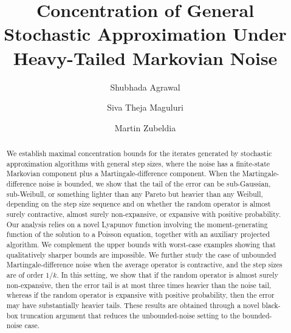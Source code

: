 \documentclass{article}
\title{Concentration of General Stochastic Approximation Under Heavy-Tailed Markovian Noise}
\author[1]{Shubhada Agrawal}
\author[2]{Siva Theja Maguluri}
\author[3]{Martin Zubeldia}
\affil[1]{Indian Institute of Science, \texttt{shubhada@iisc.ac.in}}
\affil[2]{Georgia Institute of Technology, \texttt{siva.theja@gatech.edu}}
\affil[3]{University of Minnesota, \texttt{zubeldia@umn.edu}}
\date{}
\begin{document}
\maketitle

\begin{abstract} 
We establish maximal concentration bounds for the iterates generated by stochastic approximation algorithms with general step sizes, where the noise has a finite-state Markovian component plus a Martingale-difference component. When the Martingale-difference noise is bounded, we show that the tail of the error can be sub-Gaussian, sub-Weibull, or something lighter than any Pareto but heavier than any Weibull, depending on the step size sequence and on whether the random operator is almost surely contractive, almost surely non-expansive, or expansive with positive probability. Our analysis relies on a novel Lyapunov function involving the moment-generating function of the solution to a Poisson equation, together with an auxiliary projected algorithm. We complement the upper bounds with worst-case examples showing that qualitatively sharper bounds are impossible. We further study the case of unbounded Martingale-difference noise when the average operator is contractive, and the step sizes are of order $1/k$. In this setting, we show that if the random operator is almost surely non-expansive, then the error tail is at most three times heavier than the noise tail, whereas if the random operator is expansive with positive probability, then the error may have substantially heavier tails. These results are obtained through a novel black-box truncation argument that reduces the unbounded-noise setting to the bounded-noise case.
\end{abstract}


\setcounter{tocdepth}{2}
\tableofcontents

\end{document}
